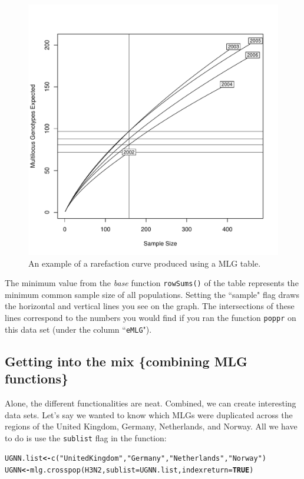 \documentclass[letterpaper]{article}\usepackage[]{graphicx}\usepackage[]{color}
\makeatletter
\newcommand{\hlnum}[1]{\textcolor[rgb]{0.502,0,0.502}{\textbf{#1}}}%
\newcommand{\hlstr}[1]{\textcolor[rgb]{0.651,0.522,0}{#1}}%
\newcommand{\hlstd}[1]{\textcolor[rgb]{0,0,0}{#1}}%
\newcommand{\hlkwb}[1]{\textcolor[rgb]{0.502,0.502,0.753}{\textbf{#1}}}%
\newcommand{\hlkwc}[1]{\textcolor[rgb]{0,0.502,0.753}{#1}}%
\newcommand{\hlkwd}[1]{\textcolor[rgb]{0,0.267,0.4}{#1}}%
\newenvironment{kframe}{%
 \def\at@end@of@kframe{}%
 \ifinner\ifhmode%
  \def\at@end@of@kframe{\end{minipage}}%
  \begin{minipage}{\columnwidth}%
 \fi\fi%
 \def\FrameCommand##1{\hskip\@totalleftmargin \hskip-\fboxsep
 \colorbox{shadecolor}{##1}\hskip-\fboxsep
     \hskip-\linewidth \hskip-\@totalleftmargin \hskip\columnwidth}%
 \MakeFramed {\advance\hsize-\width
   \@totalleftmargin\z@ \linewidth\hsize
   \@setminipage}}%
 {\par\unskip\endMakeFramed%
 \at@end@of@kframe}
\newenvironment{knitrout}{}{} %
\newcommand{\tab}{\hspace*{1em}}
\makeatother
\begin{document}
\begin{figure}[h!]
  \centering
  \caption{\footnotesize An example of a rarefaction curve produced using a MLG table.}
  \label{rarecurve}
\begin{knitrout}\footnotesize
{}\color{fgcolor}

{\centering \includegraphics[width=0.5\linewidth]{figure/mlgrareplot} 

}



\end{knitrout}

\end{figure}
\newpage

The minimum value from the \textit{base} function \texttt{rowSums()} of the table represents the minimum common sample size of all populations. Setting the ``sample" flag draws the horizontal and vertical lines you see on the graph. The intersections of these lines correspond to the numbers you would find if you ran the function \texttt{poppr} on this data set (under the column ``\texttt{eMLG}").
\subsection{Getting into the mix \{combining MLG functions\}}\label{mlg:mix}

\tab\tab Alone, the different functionalities are neat. Combined, we can create interesting data sets. Let's say we wanted to know which MLGs were duplicated across the regions of the United Kingdom, Germany, Netherlands, and Norway. All we have to do is use the \texttt{sublist} flag in the function:
\begin{knitrout}\footnotesize
{}\color{fgcolor}\begin{kframe}
\begin{alltt}
\hlstd{UGNN.list} \hlkwb{<-} \hlkwd{c}\hlstd{(}\hlstr{"United Kingdom"}\hlstd{,} \hlstr{"Germany"}\hlstd{,} \hlstr{"Netherlands"}\hlstd{,} \hlstr{"Norway"}\hlstd{)}
\hlstd{UGNN} \hlkwb{<-} \hlkwd{mlg.crosspop}\hlstd{(H3N2,} \hlkwc{sublist} \hlstd{= UGNN.list,} \hlkwc{indexreturn} \hlstd{=} \hlnum{TRUE}\hlstd{)}
\end{alltt}
\end{kframe}
\end{knitrout}
\end{document}
